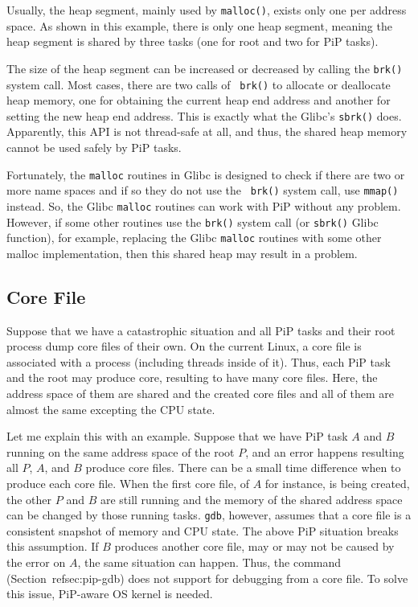 Usually, the heap segment, mainly used by {\tt malloc()}, exists only
one per address space. As shown in this example, there is only one heap
segment, meaning the heap segment is shared by three tasks (one for
root and two for PiP tasks). 

The size of the heap segment can be increased or decreased by calling
the {\tt brk()} system call. Most cases, there are two calls of {\tt
  brk()} to allocate or deallocate heap memory, one for obtaining the
current heap end address and another for setting the new heap end 
address. This is exactly what the Glibc's {\tt sbrk()}
does. Apparently, this API is not thread-safe at all, and thus, 
the shared heap memory cannot be used safely by PiP tasks.

Fortunately, the {\tt malloc} routines in Glibc is designed to check if
there are two or more name spaces and if so they do not use the {\tt
  brk()} system call, use {\tt mmap()} instead. So, the Glibc {\tt malloc}
routines can work with PiP without any problem. However, if some other 
routines use the {\tt brk()} system call (or {\tt sbrk()} Glibc
function), for example, replacing the Glibc {\tt malloc} routines with
some other malloc implementation, then this shared heap may result in a
problem.

\subsection{Core File}

Suppose that we have a catastrophic situation and all PiP tasks and
their root process dump core files of their own. On the current Linux,
a core file is associated with a process (including threads inside of
it). Thus, each PiP task and the root may produce core, resulting to
have many core files. Here, the address space of them are shared and
the created core files and all of them are almost the same excepting
the CPU state. 

Let me explain this with an example. Suppose that we have PiP task $A$
and $B$ running on the same address space of the root $P$, and an
error happens resulting all $P$, $A$, and $B$ produce core
files. There can be a small time difference when to produce each core
file. When the first core file, of $A$ for instance, is being created,
the other $P$ and $B$ are still running and the memory of the shared 
address space can be changed by those running tasks.
{\tt gdb}, however, assumes that a core file is a consistent snapshot
of memory and CPU state. The above PiP situation breaks this
assumption. If $B$ produces another core file, may or may not be
caused by the error on $A$, the same situation can happen.
Thus, the  command (Section~ref{sec:pip-gdb}) does
not support for debugging from a core file. To solve this issue,
PiP-aware OS kernel is needed. 

